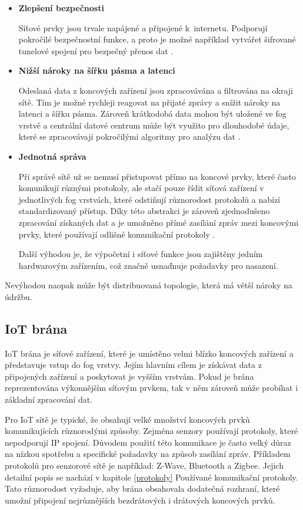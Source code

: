  \begin{itemize}
 \item \textbf{Zlepšení bezpečnosti} 
 
     Síťové prvky jsou trvale napájené a připojené k internetu. Podporují pokročilé
     bezpečnostní funkce, a proto je možné například vytvářet šifrované tunelové
     spojení pro bezpečný přenos dat \cite{fog}.     
\item \textbf{Nižší nároky na šířku pásma a latenci} 

    Odeslaná data z koncových zařízení jsou zpracovávána a filtrována na okraji 
    sítě. Tím je možné rychleji reagovat na přijaté zprávy a snížit nároky
    na latenci a šířku pásma. Zároveň krátkodobá data mohou být uložené ve 
    fog vrstvě a centrální datové centrum může být využito pro dlouhodobé údaje, 
    které se zpracovávají pokročilými algoritmy pro analýzu dat \cite{fog}.
 \item \textbf{Jednotná správa} 
 
    Při správě sítě už se nemusí přistupovat přímo na koncové prvky, které 
    často komunikují různými protokoly, ale stačí pouze
    řídit síťová zařízení v jednotlivých fog vrstvách, které odstiňují různorodost
    protokolů a nabízí standardizovaný přístup. Díky této abstrakci je 
    zároveň zjednodušeno zpracování získaných dat a je umožněno přímé zasílání zpráv
    mezi koncovými prvky, které používají odlišné komunikační protokoly \cite{fog}.
    
    Další výhodou je, že výpočetní i síťové funkce jsou zajištěny jedním hardwarovým
    zařízením, což značně usnaďnuje požadavky pro nasazení.
 \end{itemize} 
 
 Nevýhodou naopak může být distribuovaná topologie, která má větší nároky na údržbu.
 
 \subsection{IoT brána} 
 IoT brána je síťové zařízení, které je umístěno velmi blízko koncových zařízení
 a představuje vstup do fog vrstvy. Jejím hlavním cílem je získávat data 
 z připojených zařízení a poskytovat je vyšším vrstvám. Pokud je brána reprezentována
 výkonnějším síťovým prvkem, tak v něm zároveň může probíhat i základní zpracování
 dat. 
 
 Pro IoT sítě je typické, že obsahují velké množství koncových prvků komunikujících
 různorodými způsoby. Zejména senzory používají protokoly, které nepodporují
 IP spojení. Důvodem použití této komunikace je často velký
 důraz na nízkou spotřebu a specifické požadavky na způsob zasílání zpráv.
 Příkladem protokolů pro senzorové sítě je například:
 Z-Wave, Bluetooth a Zigbee. Jejich detailní popis se nachází v kapitole 
 \ref{protokoly} Používané komunikační protokoly.
 Tato různorodost vyžaduje, aby brána obsahovala dodatečná rozhraní, které 
 umožní připojení nejrůznějších bezdrátových i drátových koncových prvků. 
 
